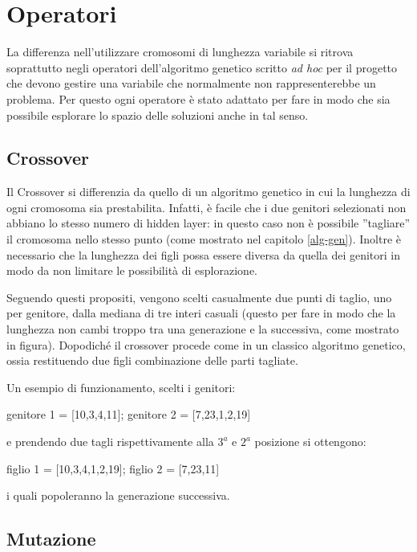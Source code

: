 \documentclass[12pt,a4paper]{report}
\begin{document}
\section{Operatori}

La differenza nell'utilizzare cromosomi di lunghezza variabile si ritrova soprattutto negli operatori dell'algoritmo genetico scritto \textit{ad hoc} per il progetto che devono gestire una variabile che normalmente non rappresenterebbe un problema. 
Per questo ogni operatore è stato adattato per fare in modo che sia possibile esplorare lo spazio delle soluzioni anche in tal senso.

\subsection{Crossover}

Il Crossover si differenzia da quello di un algoritmo genetico in cui la lunghezza di ogni cromosoma sia prestabilita. 
Infatti, è facile che i due genitori selezionati non abbiano lo stesso numero di hidden layer: in questo caso non è possibile ''tagliare'' il cromosoma nello stesso punto (come mostrato nel capitolo \ref{alg-gen}).
Inoltre è necessario che la lunghezza dei figli possa essere diversa da quella dei genitori in modo da non limitare le possibilità di esplorazione.

Seguendo questi propositi, vengono scelti casualmente due punti di taglio, uno per genitore, dalla mediana di tre interi casuali (questo per fare in modo che la lunghezza non cambi troppo tra una generazione e la successiva, come mostrato in figura).
Dopodiché il crossover procede come in un classico algoritmo genetico, ossia restituendo due figli combinazione delle parti tagliate.

Un esempio di funzionamento, scelti i genitori:

\begin{center}
 genitore 1 = [10,3,4,11];  genitore 2 = [7,23,1,2,19]\\
\end{center}

e prendendo due tagli rispettivamente alla $3^{a}$ e $2^{a}$ posizione si ottengono:

\begin{center}
 figlio 1 = [10,3,4,1,2,19]; figlio 2 = [7,23,11]
\end{center}

i quali popoleranno la generazione successiva.

\subsection{Mutazione}
\end{document}
